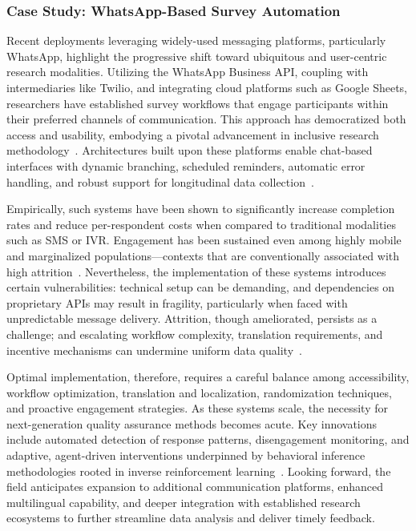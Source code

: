\subsubsection{Case Study: WhatsApp-Based Survey Automation}

Recent deployments leveraging widely-used messaging platforms, particularly WhatsApp, highlight the progressive shift toward ubiquitous and user-centric research modalities. Utilizing the WhatsApp Business API, coupling with intermediaries like Twilio, and integrating cloud platforms such as Google Sheets, researchers have established survey workflows that engage participants within their preferred channels of communication. This approach has democratized both access and usability, embodying a pivotal advancement in inclusive research methodology~\cite{ref117}. Architectures built upon these platforms enable chat-based interfaces with dynamic branching, scheduled reminders, automatic error handling, and robust support for longitudinal data collection~\cite{ref117}.

Empirically, such systems have been shown to significantly increase completion rates and reduce per-respondent costs when compared to traditional modalities such as SMS or IVR. Engagement has been sustained even among highly mobile and marginalized populations—contexts that are conventionally associated with high attrition~\cite{ref117}. Nevertheless, the implementation of these systems introduces certain vulnerabilities: technical setup can be demanding, and dependencies on proprietary APIs may result in fragility, particularly when faced with unpredictable message delivery. Attrition, though ameliorated, persists as a challenge; and escalating workflow complexity, translation requirements, and incentive mechanisms can undermine uniform data quality~\cite{ref117}.

Optimal implementation, therefore, requires a careful balance among accessibility, workflow optimization, translation and localization, randomization techniques, and proactive engagement strategies. As these systems scale, the necessity for next-generation quality assurance methods becomes acute. Key innovations include automated detection of response patterns, disengagement monitoring, and adaptive, agent-driven interventions underpinned by behavioral inference methodologies rooted in inverse reinforcement learning~\cite{ref18}. Looking forward, the field anticipates expansion to additional communication platforms, enhanced multilingual capability, and deeper integration with established research ecosystems to further streamline data analysis and deliver timely feedback.

